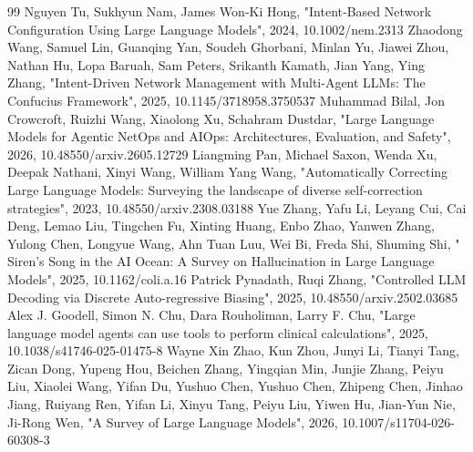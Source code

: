 \documentclass[conference]{IEEEtran}
\begin{document}
\begin{thebibliography}{99}
 Nguyen Tu, Sukhyun Nam, James Won‐Ki Hong, "Intent‐Based Network Configuration Using Large Language Models", 2024, 10.1002/nem.2313
 Zhaodong Wang, Samuel Lin, Guanqing Yan, Soudeh Ghorbani, Minlan Yu, Jiawei Zhou, Nathan Hu, Lopa Baruah, Sam Peters, Srikanth Kamath, Jian Yang, Ying Zhang, "Intent-Driven Network Management with Multi-Agent LLMs: The Confucius Framework", 2025, 10.1145/3718958.3750537
 Muhammad Bilal, Jon Crowcroft, Ruizhi Wang, Xiaolong Xu, Schahram Dustdar, "Large Language Models for Agentic NetOps and AIOps: Architectures, Evaluation, and Safety", 2026, 10.48550/arxiv.2605.12729
 Liangming Pan, Michael Saxon, Wenda Xu, Deepak Nathani, Xinyi Wang, William Yang Wang, "Automatically Correcting Large Language Models: Surveying the landscape of diverse self-correction strategies", 2023, 10.48550/arxiv.2308.03188
 Yue Zhang, Yafu Li, Leyang Cui, Cai Deng, Lemao Liu, Tingchen Fu, Xinting Huang, Enbo Zhao, Yanwen Zhang, Yulong Chen, Longyue Wang, Ahn Tuan Luu, Wei Bi, Freda Shi, Shuming Shi, "🧜Siren's Song in the AI Ocean: A Survey on Hallucination in Large Language Models", 2025, 10.1162/coli.a.16
 Patrick Pynadath, Ruqi Zhang, "Controlled LLM Decoding via Discrete Auto-regressive Biasing", 2025, 10.48550/arxiv.2502.03685
 Alex J. Goodell, Simon N. Chu, Dara Rouholiman, Larry F. Chu, "Large language model agents can use tools to perform clinical calculations", 2025, 10.1038/s41746-025-01475-8
 Wayne Xin Zhao, Kun Zhou, Junyi Li, Tianyi Tang, Zican Dong, Yupeng Hou, Beichen Zhang, Yingqian Min, Junjie Zhang, Peiyu Liu, Xiaolei Wang, Yifan Du, Yushuo Chen, Yushuo Chen, Zhipeng Chen, Jinhao Jiang, Ruiyang Ren, Yifan Li, Xinyu Tang, Peiyu Liu, Yiwen Hu, Jian‐Yun Nie, Ji-Rong Wen, "A Survey of Large Language Models", 2026, 10.1007/s11704-026-60308-3
\end{thebibliography}
\end{document}
